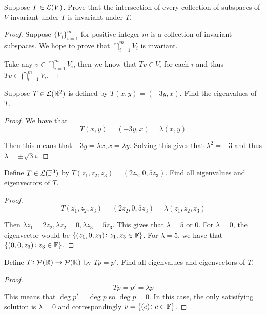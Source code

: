 \documentclass{extarticle}
\begin{document}
\begin{problem}{3}
    Suppose \(T \in \mathcal{L}(V)\). Prove that the intersection of every collection of 
    subspaces of \(V\) invariant under \(T\) is invariant under \(T\).
\end{problem}

\begin{proof}
Suppose \(\{V_i\}_{i=1}^m\) for positive integer \(m\) is a collection of invariant subspaces. 
We hope to prove that \(\bigcap_{i=1}^m V_i\) is invariant. 

Take any \(v \in \bigcap_{i=1}^m V_i\), then we know that \(Tv \in V_i\) for each \(i\)
and thus \(Tv \in \bigcap_{i=1}^m V_i\).
\end{proof}

\begin{problem}{5}
    Suppose \(T \in \mathcal{L}(\mathbb{R}^2)\) is defined by \(T(x, y) = (-3y, x)\). Find the eigenvalues 
    of \(T\).
\end{problem}

\begin{proof}
We have that 
\[T(x, y) = (-3 y, x) = \lambda(x, y)\]

Then this means that \(-3y = \lambda x, x= \lambda y\). Solving this gives that \(\lambda^2 = -3\)
and thus \(\lambda = \pm \sqrt{3}i\). 
\end{proof}

\begin{problem}{7}
    Define \(T \in \mathcal{L}(\mathbb{F}^3)\) by \(T(z_1, z_2, z_3) = (2z_2, 0, 5z_3)\). Find all eigenvalues 
    and eigenvectors of \(T\).
\end{problem}


\begin{proof}
\[T(z_1, z_2, z_3) = (2z_2, 0, 5z_3) = \lambda(z_1, z_2, z_3)\]

Then \(\lambda z_1 = 2z_2, \lambda z_2 = 0, \lambda z_3 = 5 z_3\). This gives that \(\lambda=5 \text{ or } 0\).
For \(\lambda = 0\), the eigenvector would be \(\{(z_1, 0, z_3) \colon z_1, z_3 \in \mathbb{F}\}\). 
For \(\lambda = 5\), we have that \(\{(0, 0, z_3) \colon z_3 \in \mathbb{F}\}\). 


\end{proof}


\begin{problem}{9}
    Define \(T \colon \mathcal{P}(\mathbb{R}) \to \mathcal{P}(\mathbb{R})\) by \(Tp = p'\). Find all eigenvalues and 
    eigenvectors of \(T\).
\end{problem}


\begin{proof}
\[Tp = p' = \lambda p\]
This means that \(\deg p' = \deg p\) so \(\deg p = 0\). In this case, the only satisifying 
solution is \(\lambda = 0\) and correspondingly \(v = \{(c) \colon c \in \mathbb{F}\}\).
\end{proof}
\end{document}
